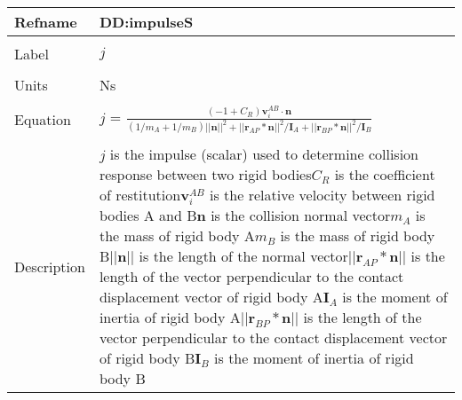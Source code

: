 \documentclass[12pt]{article}
\begin{document}
\noindent \begin{minipage}{\textwidth}
\begin{tabular}{p{} p{}}
\toprule \textbf{Refname} & \textbf{DD:impulseS}
\label{DD:impulseS}
\\ \midrule \\
Label & $j$
\\ \midrule \\
Units & Ns
\\ \midrule \\
Equation & $j$ = $\frac{(-1+C_{R})\mathbf{v}_{i}^{AB}\cdot{}\mathbf{n}}{(1/m_{A}+1/m_{B})||\mathbf{n}||^{2}+||\mathbf{r}_{AP}*\mathbf{n}||^{2}/\mathbf{I}_{A}+||\mathbf{r}_{BP}*\mathbf{n}||^{2}/\mathbf{I}_{B}}$
\\ \midrule \\
Description & $j$ is the impulse (scalar) used to determine collision response between two rigid bodies\newline$C_{R}$ is the coefficient of restitution\newline$\mathbf{v}_{i}^{AB}$ is the relative velocity between rigid bodies A and B\newline$\mathbf{n}$ is the collision normal vector\newline$m_{A}$ is the mass of rigid body A\newline$m_{B}$ is the mass of rigid body B\newline$||\mathbf{n}||$ is the length of the normal vector\newline$||\mathbf{r}_{AP}*\mathbf{n}||$ is the length of the vector perpendicular to the contact displacement vector of rigid body A\newline$\mathbf{I}_{A}$ is the moment of inertia of rigid body A\newline$||\mathbf{r}_{BP}*\mathbf{n}||$ is the length of the vector perpendicular to the contact displacement vector of rigid body B\newline$\mathbf{I}_{B}$ is the moment of inertia of rigid body B
\\ \bottomrule \end{tabular}
\end{minipage}\\
\end{document}
